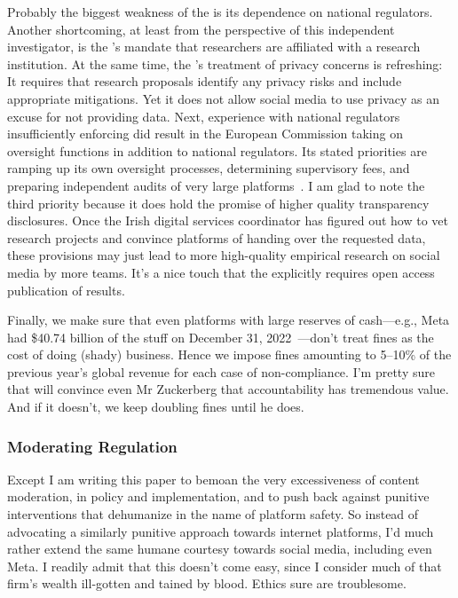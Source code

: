Probably the biggest weakness of the  is its dependence on national
regulators. Another shortcoming, at least from the perspective of this
independent investigator, is the 's mandate that researchers are affiliated
with a research institution. At the same time, the 's treatment of privacy
concerns is refreshing: It requires that research proposals identify any privacy
risks and include appropriate mitigations. Yet it does not allow social media to
use privacy as an excuse for not providing data. Next, experience with national
regulators insufficiently enforcing  did result in the European
Commission taking on  oversight functions in addition to national
regulators. Its stated priorities are ramping up its own oversight processes,
determining supervisory fees, and preparing independent audits of very large
platforms~\cite{Bertuzzi2022,TenThije2022}. I am glad to note the third priority
because it does hold the promise of higher quality transparency disclosures.
Once the Irish digital services coordinator has figured out how to vet research
projects and convince platforms of handing over the requested data, these
provisions may just lead to more high-quality empirical research on social media
by more teams. It's a nice touch that the  explicitly requires open access
publication of results.

Finally, we make sure that even platforms with large reserves of cash---e.g.,
Meta had \$40.74 billion of the stuff on December 31,
2022~\cite{MetaPlatforms2023}---don't treat fines as the cost of doing (shady)
business. Hence we impose fines amounting to 5--10\% of the previous year's
global revenue for each case of non-compliance. I'm pretty sure that will
convince even Mr Zuckerberg that accountability has tremendous value. And if it
doesn't, we keep doubling fines until he does.


\subsubsection{Moderating Regulation}
\label{sec:moderating:regulation}

Except I am writing this paper to bemoan the very excessiveness of content
moderation, in policy and implementation, and to push back against punitive
interventions that dehumanize in the name of platform safety. So instead of
advocating a similarly punitive approach towards internet platforms, I'd much
rather extend the same humane courtesy towards social media, including even
Meta. I readily admit that this doesn't come easy, since I consider much of that
firm's wealth ill-gotten and tained by blood. Ethics sure are troublesome.

